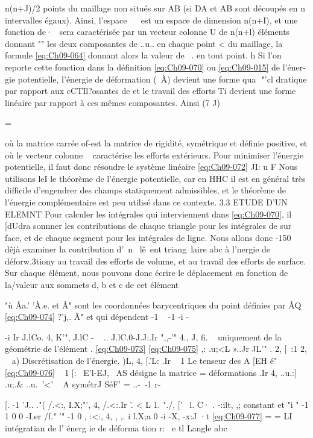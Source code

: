 {{{n(n+J)/2 points du maillage non situés sur AB (si DA et AB sont découpés en n intervalles égaux). Ainsi, l'espace ~~ est un espace de dimension n(n+I), et une fonction de·~ sera caractérisée par un vecteur colonne 
U de n(n+l) éléments donnant "" les deux composantes de ..u.. en chaque point
<
du maillage, la formule \eqref{eq:Ch09-064} donnant alors la valeur de ~. en tout point.
h 
Si l'on reporte cette fonction dans la définition \eqref{eq:Ch09-070} ou \eqref{eq:Ch09-015} de l'éner­gie potentielle, l'énergie de déformation \V(~À) devient une forme qua
 "'cl
dratique par rapport aux cCTIl?osantes de \! et le travail des efforts Ti 
devient une forme linéaire par rapport à ces mêmes composantes. Ainsi 
(7 J) 

= 

où la matrice carrée of-est la matrice de rigidité, symétrique et définie 
positive, et où le vecteur colonne ~ caractérise les efforts extérieurs. Pour minimiser l'énergie potentielle, il faut donc résoudre le système 
linéaire 
\eqref{eq:Ch09-072} JI: u F 
Nous utilisons leI le théorème de l'énergie potentielle, car en 
HHC il est en général très difficile d'engendrer des champs statiquement 
admissibles, et le théorème de l'énergie complémentaire est peu utilisé dans ce contexte. 
3.3 ETUDE D'UN ELEMNT 
Pour calculer les intégrales qui interviennent dans \eqref{eq:Ch09-070}, il [dU­dra sonnner les contributions de chaque triangle pour les intégrales de sur face, et de chaque segment pour les intégrales de ligne. Nous allons donc 
-150 
dêjà examiner la contribution d'~n ~lê~ent triang~laire abc à l'nergie de déforw.3tiony au travail des efforts de volume, et au travail des efforts de surface. 
Sur chaque élément, nous pouvons donc écrire le déplacement en fonction de la/valeur aux sommets d, b et c de cet élément 

"ù Âa.' 'À.e. et Â" sont les coordonnées barycentriques du point 
définies par 
ÂQ 
\eqref{eq:Ch09-074} 
?'j,. 
Â" 
et qui dépendent 
-1 
~ 
-1
-i -{ -i 
Ir
J.lCo. 
4, K'", 
J.lC
-
~ 
.. 
J.lC.0-J.J:.Ir ",,-'" 
4.,
J,
fi. ~ 
uniquement de la géométrie de l'élément . \eqref{eq:Ch09-073} 
\eqref{eq:Ch09-075} ,: 
.u;<L »..Jr JL'" 
. 2,
[~:1 
2, 
~ 
a) Discrétisation de l'énergie. 
)L, 4,
[.'L: .Ir ~ 1 
Le tenseur des 
A
[EH é"
\eqref{eq:Ch09-076} 
~
1 
[:~
E'l-EJ,~ 
AS 
désigne la matrice 
= 
déformations 
.Ir 
4, ..u.:] 
.u;.&
..u.~'<' 
~ 
A symétrJ SéF' 
= 
..-\ -1 
r-{ [. -1 
'J.. 
."( /.<:, I.X;"', 
4, 
/.<:.Ir '. <
L 1. "./, 
[' 
~l. 
C· . -:ilt, ,; constant et 
"i " 
-1 1 
0 0 
-I.er
/f." '" 
-1 0
, :<:, 4, 
,
,. i 
l.X;a 
0 -i
-X, 
-x:J
·t 
\eqref{eq:Ch09-077} 
= 
= LI intégratian de l' énerg ie de déforma tion r: ~e tl Langle abc 


}}}}}
